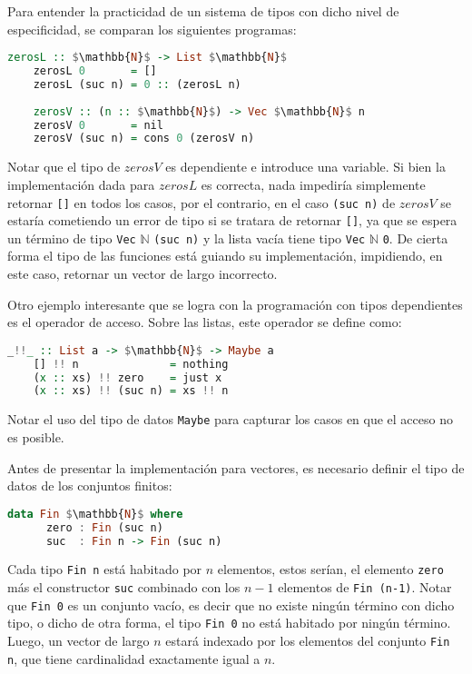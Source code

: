 Para entender la practicidad de un sistema de tipos con dicho nivel de especificidad, se comparan los siguientes programas:
\begin{lstlisting}[mathescape, language=Haskell]
	zerosL :: $\mathbb{N}$ -> List $\mathbb{N}$
	zerosL 0       = []
	zerosL (suc n) = 0 :: (zerosL n)
	
	zerosV :: (n :: $\mathbb{N}$) -> Vec $\mathbb{N}$ n
	zerosV 0       = nil
	zerosV (suc n) = cons 0 (zerosV n)
\end{lstlisting}

Notar que el tipo de $zerosV$ es dependiente e introduce una variable.
Si bien la implementación dada para $zerosL$ es correcta, nada impediría simplemente retornar \verb|[]| en todos los casos, por el contrario, en el caso \verb|(suc n)| de $zerosV$ se estaría cometiendo un error de tipo si se tratara de retornar \verb|[]|, ya que se espera un término de tipo \verb|Vec| $\mathbb{N}$ \verb|(suc n)| y la lista vacía tiene tipo \verb|Vec| $\mathbb{N}$ \verb|0|.
De cierta forma el tipo de las funciones está guiando su implementación, impidiendo, en este caso, retornar un vector de largo incorrecto.

Otro ejemplo interesante que se logra con la programación con tipos dependientes es el operador de acceso. Sobre las listas, este operador se define como:

\begin{lstlisting}[mathescape, language=Haskell, deletekeywords={zero}]
	_!!_ :: List a -> $\mathbb{N}$ -> Maybe a
	[] !! n              = nothing
	(x :: xs) !! zero    = just x
	(x :: xs) !! (suc n) = xs !! n
\end{lstlisting}

Notar el uso del tipo de datos \verb|Maybe| para capturar los casos en que el acceso no es posible.

Antes de presentar la implementación para vectores, es necesario definir el tipo de datos de los conjuntos finitos:

\begin{lstlisting}[mathescape, language=Haskell, deletekeywords={zero}]
	data Fin $\mathbb{N}$ where
	  zero : Fin (suc n)
	  suc  : Fin n -> Fin (suc n)
\end{lstlisting}

Cada tipo \verb|Fin n| está habitado por $n$ elementos, estos serían, el elemento \verb|zero| más el constructor \verb|suc| combinado con los $n-1$ elementos de \verb|Fin (n-1)|.
Notar que \verb|Fin 0| es un conjunto vacío, es decir que no existe ningún término con dicho tipo, o dicho de otra forma, el tipo \verb|Fin 0| no está habitado por ningún término.
Luego, un vector de largo $n$ estará indexado por los elementos del conjunto \verb|Fin n|, que tiene cardinalidad exactamente igual a $n$.

